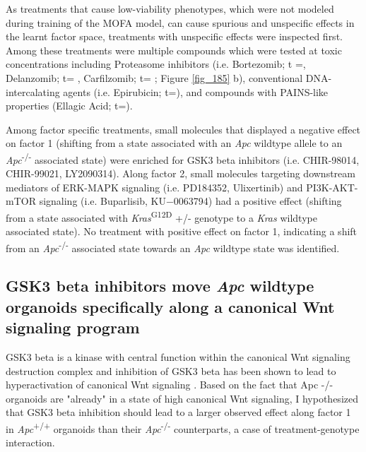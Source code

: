 \begin{flushleft}
As treatments that cause low-viability phenotypes, which were not modeled during training of the MOFA model, can cause spurious and unspecific effects in the learnt factor space, treatments with unspecific effects were inspected first. Among these treatments were multiple compounds which were tested at toxic concentrations including Proteasome inhibitors (i.e. Bortezomib; t =, Delanzomib; t= , Carfilzomib; t= ; Figure \ref{fig_185} b), conventional DNA-intercalating agents (i.e. Epirubicin; t=), and compounds with PAINS-like properties (Ellagic Acid; t=). 
\par

Among factor specific treatments, small molecules that displayed a negative effect on factor 1 (shifting from a state associated with an \textit{Apc} wildtype allele to an \textit{Apc}\textsuperscript{-/-}  associated state) were enriched for GSK3 beta inhibitors (i.e. CHIR-98014, CHIR-99021, LY2090314). Along factor 2, small molecules targeting downstream mediators of ERK-MAPK signaling (i.e.  PD184352, Ulixertinib) and PI3K-AKT-mTOR signaling (i.e. Buparlisib, KU−0063794) had a positive effect (shifting from a state associated with \textit{Kras}\textsuperscript{G12D} +/- genotype to a \textit{Kras} wildtype associated state). No treatment with positive effect on factor 1, indicating a shift from an \textit{Apc}\textsuperscript{-/-}  associated state towards an \textit{Apc} wildtype state was identified. 

\subsection{GSK3 beta inhibitors move \textit{Apc} wildtype organoids specifically along a canonical Wnt signaling program}

GSK3 beta is a kinase with central function within the canonical Wnt signaling destruction complex \citep{stamos} and inhibition of GSK3 beta has been shown to lead to hyperactivation of canonical Wnt signaling \citep{Stambolic}. Based on the fact that Apc -/- organoids are "already" in a state of high canonical Wnt signaling, I hypothesized that GSK3 beta inhibition should lead to a larger observed effect along factor 1 in \textit{Apc}\textsuperscript{+/+} organoids than their \textit{Apc}\textsuperscript{-/-}  counterparts, a case of treatment-genotype interaction. 


\end{flushleft}
